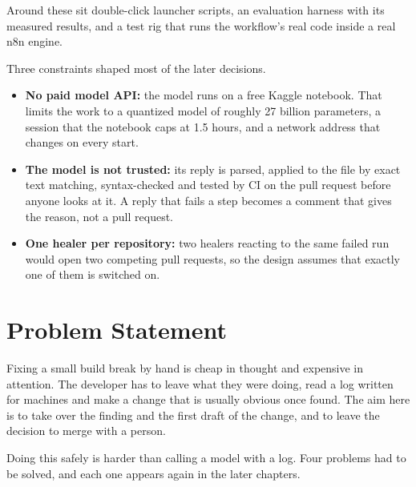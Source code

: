Around these sit double-click launcher scripts, an evaluation harness with its measured results, and a test rig that runs the workflow's real code inside a real n8n engine.

Three constraints shaped most of the later decisions.

\begin{itemize}
  \item \textbf{No paid model API:} the model runs on a free Kaggle notebook. That limits the work to a quantized model of roughly 27 billion parameters, a session that the notebook caps at 1.5 hours, and a network address that changes on every start.
  \item \textbf{The model is not trusted:} its reply is parsed, applied to the file by exact text matching, syntax-checked and tested by CI on the pull request before anyone looks at it. A reply that fails a step becomes a comment that gives the reason, not a pull request.
  \item \textbf{One healer per repository:} two healers reacting to the same failed run would open two competing pull requests, so the design assumes that exactly one of them is switched on.
\end{itemize}

\section{Problem Statement}

Fixing a small build break by hand is cheap in thought and expensive in attention. The developer has to leave what they were doing, read a log written for machines and make a change that is usually obvious once found. The aim here is to take over the finding and the first draft of the change, and to leave the decision to merge with a person.

Doing this safely is harder than calling a model with a log. Four problems had to be solved, and each one appears again in the later chapters.

